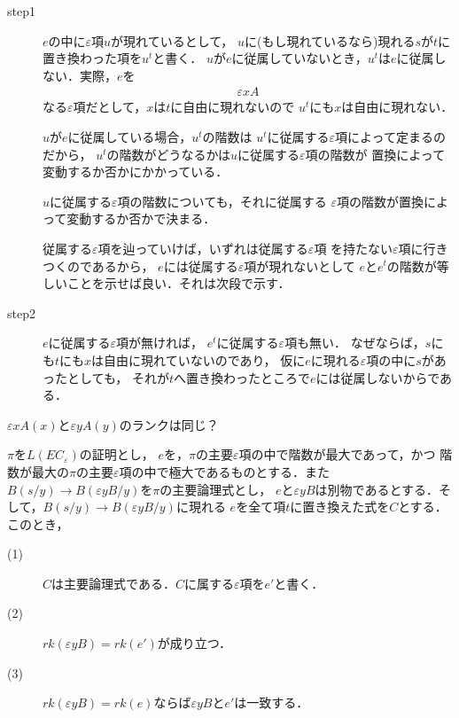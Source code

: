 	\begin{metaprf}\mbox{}
		\begin{description}
			\item[step1]
				$e$の中に$\varepsilon$項$u$が現れているとして，
				$u$に(もし現れているなら)現れる$s$が$t$に置き換わった項を$u^{t}$と書く．
				$u$が$e$に従属していないとき，$u^{t}$は$e$に従属しない．実際，$e$を
				\begin{align}
					\varepsilon x A
				\end{align}
				なる$\varepsilon$項だとして，$x$は$t$に自由に現れないので
				$u^{t}$にも$x$は自由に現れない．
				
				$u$が$e$に従属している場合，$u^{t}$の階数は
				$u^{t}$に従属する$\varepsilon$項によって定まるのだから，
				$u^{t}$の階数がどうなるかは$u$に従属する$\varepsilon$項の階数が
				置換によって変動するか否かにかかっている．
				
				$u$に従属する$\varepsilon$項の階数についても，それに従属する
				$\varepsilon$項の階数が置換によって変動するか否かで決まる．
				
				従属する$\varepsilon$項を辿っていけば，いずれは従属する$\varepsilon$項
				を持たない$\varepsilon$項に行きつくのであるから，
				$e$には従属する$\varepsilon$項が現れないとして
				$e$と$e^{t}$の階数が等しいことを示せば良い．それは次段で示す．
				
			\item[step2]
				$e$に従属する$\varepsilon$項が無ければ，
				$e^{t}$に従属する$\varepsilon$項も無い．
				なぜならば，$s$にも$t$にも$x$は自由に現れていないのであり，
				仮に$e$に現れる$\varepsilon$項の中に$s$があったとしても，
				それが$t$へ置き換わったところで$e$には従属しないからである．
				\QED
		\end{description}
	\end{metaprf}
	
	$\varepsilon x A(x)$と$\varepsilon y A(y)$のランクは同じ？
	
	\begin{screen}
		\begin{metathm}[置換定理]
			$\pi$を$L(EC_{\varepsilon})$の証明とし，
			$e$を，$\pi$の主要$\varepsilon$項の中で階数が最大であって，かつ
			階数が最大の$\pi$の主要$\varepsilon$項の中で極大であるものとする．また
			$B(s/y) \rightarrow B(\varepsilon y B/y)$を$\pi$の主要論理式とし，
			$e$と$\varepsilon y B$は別物であるとする．そして，$B(s/y) \rightarrow B(\varepsilon y B/y)$に現れる
			$e$を全て項$t$に置き換えた式を$C$とする．このとき，
			\begin{description}
				\item[(1)] $C$は主要論理式である．$C$に属する$\varepsilon$項を$e'$と書く．
				\item[(2)] $rk(\varepsilon y B) = rk(e')$が成り立つ．
				\item[(3)] $rk(\varepsilon y B) = rk(e)$ならば$\varepsilon y B$と$e'$は一致する．
			\end{description}
		\end{metathm}
	\end{screen}
	
